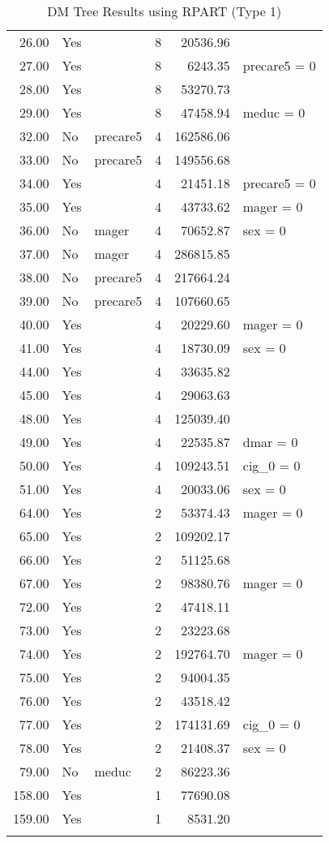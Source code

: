 \begin{longtable}{rllrrl}
  26.00 & Yes &  &   8 & 20536.96 &  \\ 
  27.00 & Yes &  &   8 & 6243.35 & precare5 = 0 \\ 
  28.00 & Yes &  &   8 & 53270.73 &  \\ 
  29.00 & Yes &  &   8 & 47458.94 & meduc = 0 \\ 
  32.00 & No & precare5 &   4 & 162586.06 &  \\ 
  33.00 & No & precare5 &   4 & 149556.68 &  \\ 
  34.00 & Yes &  &   4 & 21451.18 & precare5 = 0 \\ 
  35.00 & Yes &  &   4 & 43733.62 & mager = 0 \\ 
  36.00 & No & mager &   4 & 70652.87 & sex = 0 \\ 
  37.00 & No & mager &   4 & 286815.85 &  \\ 
  38.00 & No & precare5 &   4 & 217664.24 &  \\ 
  39.00 & No & precare5 &   4 & 107660.65 &  \\ 
  40.00 & Yes &  &   4 & 20229.60 & mager = 0 \\ 
  41.00 & Yes &  &   4 & 18730.09 & sex = 0 \\ 
  44.00 & Yes &  &   4 & 33635.82 &  \\ 
  45.00 & Yes &  &   4 & 29063.63 &  \\ 
  48.00 & Yes &  &   4 & 125039.40 &  \\ 
  49.00 & Yes &  &   4 & 22535.87 & dmar = 0 \\ 
  50.00 & Yes &  &   4 & 109243.51 & cig_0 = 0 \\ 
  51.00 & Yes &  &   4 & 20033.06 & sex = 0 \\ 
  64.00 & Yes &  &   2 & 53374.43 & mager = 0 \\ 
  65.00 & Yes &  &   2 & 109202.17 &  \\ 
  66.00 & Yes &  &   2 & 51125.68 &  \\ 
  67.00 & Yes &  &   2 & 98380.76 & mager = 0 \\ 
  72.00 & Yes &  &   2 & 47418.11 &  \\ 
  73.00 & Yes &  &   2 & 23223.68 &  \\ 
  74.00 & Yes &  &   2 & 192764.70 & mager = 0 \\ 
  75.00 & Yes &  &   2 & 94004.35 &  \\ 
  76.00 & Yes &  &   2 & 43518.42 &  \\ 
  77.00 & Yes &  &   2 & 174131.69 & cig_0 = 0 \\ 
  78.00 & Yes &  &   2 & 21408.37 & sex = 0 \\ 
  79.00 & No & meduc &   2 & 86223.36 &  \\ 
  158.00 & Yes &  &   1 & 77690.08 &  \\ 
  159.00 & Yes &  &   1 & 8531.20 &  \\ 
   \hline
\hline
\caption{DM Tree Results using RPART (Type 1)} 
\label{tab:rpart_results_type1}
\end{longtable}
\endgroup
